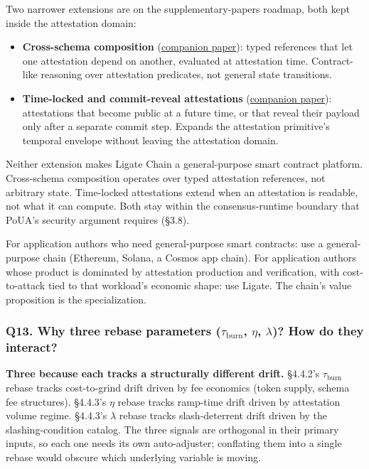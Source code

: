 \documentclass[
  11pt,
]{article}
\providecommand{\tightlist}{%
  \setlength{\itemsep}{0pt}\setlength{\parskip}{0pt}}
\begin{document}
Two narrower extensions are on the supplementary-papers roadmap, both
kept inside the attestation domain:

\begin{itemize}
\tightlist
\item
  \textbf{Cross-schema composition}
  (\href{https://github.com/ligate-io/ligate-research/tree/main/papers/cross-schema-composition}{companion
  paper}): typed references that let one attestation depend on another,
  evaluated at attestation time. Contract-like reasoning over
  attestation predicates, not general state transitions.
\item
  \textbf{Time-locked and commit-reveal attestations}
  (\href{https://github.com/ligate-io/ligate-research/tree/main/papers/time-locked-attestations}{companion
  paper}): attestations that become public at a future time, or that
  reveal their payload only after a separate commit step. Expands the
  attestation primitive's temporal envelope without leaving the
  attestation domain.
\end{itemize}

Neither extension makes Ligate Chain a general-purpose smart contract
platform. Cross-schema composition operates over typed attestation
references, not arbitrary state. Time-locked attestations extend when an
attestation is readable, not what it can compute. Both stay within the
consensus-runtime boundary that PoUA's security argument requires
(§3.8).

For application authors who need general-purpose smart contracts: use a
general-purpose chain (Ethereum, Solana, a Cosmos app chain). For
application authors whose product is dominated by attestation production
and verification, with cost-to-attack tied to that workload's economic
shape: use Ligate. The chain's value proposition is the specialization.

\subsubsection{\texorpdfstring{Q13. Why three rebase parameters
(\(\tau_{\text{burn}}\), \(\eta\), \(\lambda\))? How do they
interact?}{Q13. Why three rebase parameters (\textbackslash tau\_\{\textbackslash text\{burn\}\}, \textbackslash eta, \textbackslash lambda)? How do they interact?}}\label{q13.-why-three-rebase-parameters-tau_textburn-eta-lambda-how-do-they-interact}

\textbf{Three because each tracks a structurally different drift.}
§4.4.2's \(\tau_{\text{burn}}\) rebase tracks cost-to-grind drift driven
by fee economics (token supply, schema fee structures). §4.4.3's
\(\eta\) rebase tracks ramp-time drift driven by attestation volume
regime. §4.4.3's \(\lambda\) rebase tracks slash-deterrent drift driven
by the slashing-condition catalog. The three signals are orthogonal in
their primary inputs, so each one needs its own auto-adjuster;
conflating them into a single rebase would obscure which underlying
variable is moving.
\end{document}
